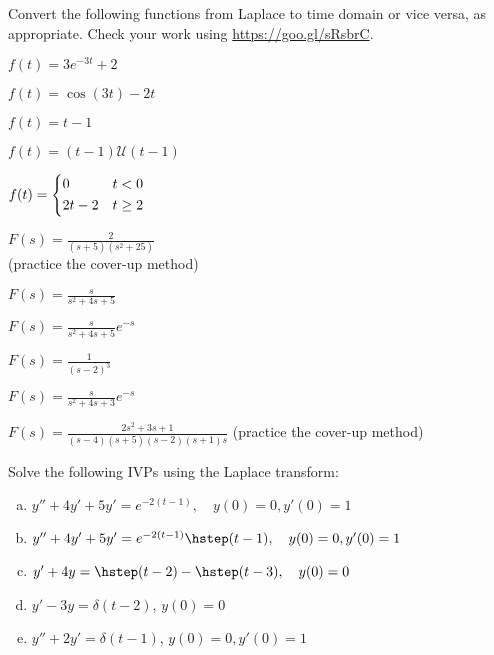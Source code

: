 \begin{question}
  Convert the following functions from Laplace to time domain or vice versa, as appropriate. Check your work using \url{https://goo.gl/sRsbrC}.

\begin{fullwidth}
\begin{colenumerate}[3]
\item    \(f(t) = 3 e^{-3t} + 2\)
\item    \(f(t) = \cos(3t) - 2t\)
\item     \(f(t) = t - 1\)
\item    \(f(t) = (t-1)\mathcal{U}(t-1)\)
\item    \(f(t) = \begin{dcases}
      0 & t < 0 \\
      2t-2 & t \geq 2
    \end{dcases}
    \)
\item    \(
    F(s) = \frac{2}{(s+5)(s^{2}+25)}
    \) \\{\scriptsize (practice the cover-up method)}
\item    \(
    F(s) = \frac{s}{s^{2} + 4s + 5}
    \)
\item    \(
    F(s) = \frac{s}{s^{2} + 4s + 5} e^{-s}
    \)
\item    \(F(s) = \frac{1}{(s-2)^{3}}\)
\item    \(
    F(s) = \frac{s}{s^{2} + 4s + 3} e^{-s}
    \)
\item    \(
    F(s) = \frac{2s^{2} + 3s + 1}{(s-4)(s+5)(s-2)(s+1)s}
    \) {\scriptsize (practice the cover-up method)}
  \end{colenumerate}
\end{fullwidth}

\end{question}
  \begin{question}
Solve the following IVPs using the Laplace transform:
\begin{enumerate}[(a)]
\item \( y'' + 4y' + 5y' = e^{-2(t-1)}, \quad  y(0) = 0, y'(0) = 1 \)
\item \( y'' + 4y' + 5y' = e^{-2(t-1)}\hstep(t-1), \quad   y(0) = 0, y'(0) = 1 \)
\item \( y' + 4y  = \hstep(t-2) - \hstep(t-3), \quad  y(0) = 0 \)
\item $y'-3y=\delta(t-2)$, $y(0) = 0$
\item $y''+2y'=\delta(t-1)$, $y(0) = 0, y'(0)=1$
\end{enumerate}
\end{question}

